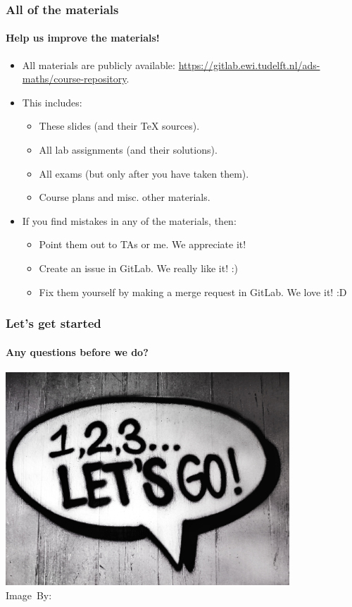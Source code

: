 \begin{frame}
	\frametitle{All of the materials}
	\framesubtitle{Help us improve the materials!}

	\begin{itemize}
		\item All materials are publicly available: \url{https://gitlab.ewi.tudelft.nl/ads-maths/course-repository}.
			\pause
		\item This includes:
			\begin{itemize}
				\item These slides \pause (and their TeX sources).
					\pause
				\item All lab assignments \pause (and their solutions).
					\pause
				\item All exams \pause (but only after you have taken them).
					\pause
				\item Course plans and misc. other materials.
			\end{itemize}
			\pause
		\item If you find mistakes in any of the materials, then:
			\begin{itemize}
				\item Point them out to TAs or me. We appreciate it!
					\pause
				\item Create an issue in GitLab. We really like it!  :)
					\pause
				\item Fix them yourself by making a merge request in GitLab. We love it! :D
			\end{itemize}
	\end{itemize}
\end{frame}

\begin{frame}
	\frametitle{Let's get started}
	\framesubtitle{Any questions before we do?}
	\begin{center}
		\includegraphics[width=0.8\textwidth]{figures/letsgo.jpg}\\
		\hspace*{15pt}\hbox{\scriptsize Image By:}
	\end{center}
\end{frame}
